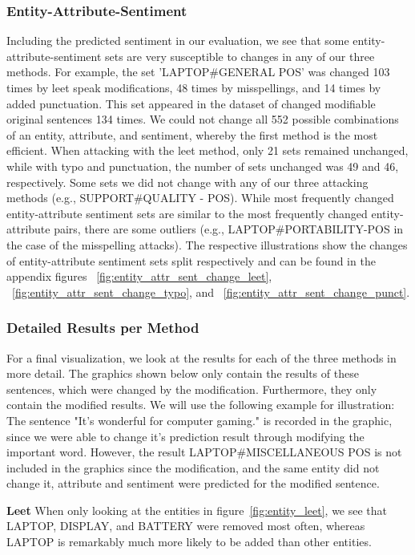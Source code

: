 \subsubsection{Entity-Attribute-Sentiment}
Including the predicted sentiment in our evaluation, we see that some entity-attribute-sentiment sets are very susceptible to changes in any of our three methods. For example, the set 'LAPTOP\#GENERAL POS' was changed 103 times by leet speak modifications, 48 times by misspellings, and 14 times by added punctuation. This set appeared in the dataset of changed modifiable original sentences 134 times. We could not change all 552 possible combinations of an entity, attribute, and sentiment, whereby the first method is the most efficient. When attacking with the leet method, only 21 sets remained unchanged, while with typo and punctuation, the number of sets unchanged was 49 and 46, respectively. Some sets we did not change with any of our three attacking methods (e.g., SUPPORT\#QUALITY - POS). While most frequently changed entity-attribute sentiment sets are similar to the most frequently changed entity-attribute pairs, there are some outliers (e.g., LAPTOP\#PORTABILITY-POS in the case of the misspelling attacks). The respective illustrations show the changes of entity-attribute sentiment sets split respectively and can be found in the appendix figures ~\ref{fig:entity_attr_sent_change_leet}, ~\ref{fig:entity_attr_sent_change_typo}, and ~\ref{fig:entity_attr_sent_change_punct}.

\subsubsection{Detailed Results per Method}

For a final visualization, we look at the results for each of the three methods in more detail.
The graphics shown below only contain the results of these sentences, which were changed by the modification. Furthermore, they only contain the modified results. We will use the following example for illustration:
The sentence "It's wonderful for computer gaming." is recorded in the graphic, since we were able to change it's prediction result through modifying the important word. However, the result LAPTOP\#MISCELLANEOUS POS is not included in the graphics since the modification, and the same entity did not change it, attribute and sentiment were predicted for the modified sentence.

\textbf{Leet}
When only looking at the entities in figure~\ref{fig:entity_leet}, we see that LAPTOP, DISPLAY, and BATTERY were removed most often, whereas LAPTOP is remarkably much more likely to be added than other entities.

